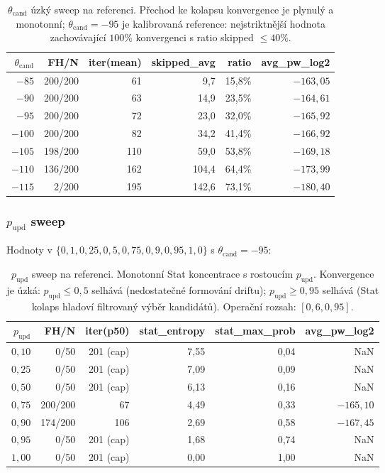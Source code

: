 \documentclass[11pt,a4paper]{article}
\begin{document}
\begin{table}[ht]
\centering
\small
\begin{tabular}{rrrrrr}
\toprule
$\theta_\text{cand}$ & FH/N & iter(mean) & skipped\_avg & ratio & avg\_pw\_log2 \\
\midrule
$-85$ & 200/200 & 61 & 9{,}7 & 15{,}8\% & $-163{,}05$ \\
$-90$ & 200/200 & 63 & 14{,}9 & 23{,}5\% & $-164{,}61$ \\
$-95$ & 200/200 & 72 & 23{,}0 & 32{,}0\% & $-165{,}92$ \\
$-100$ & 200/200 & 82 & 34{,}2 & 41{,}4\% & $-166{,}92$ \\
$-105$ & 198/200 & 110 & 59{,}0 & 53{,}8\% & $-169{,}18$ \\
$-110$ & 136/200 & 162 & 104{,}4 & 64{,}4\% & $-173{,}99$ \\
$-115$ & 2/200 & 195 & 142{,}6 & 73{,}1\% & $-180{,}40$ \\
\bottomrule
\end{tabular}
\caption{$\theta_\text{cand}$ úzký sweep na referenci. Přechod ke kolapsu konvergence je plynulý a monotonní; $\theta_\text{cand} = -95$ je kalibrovaná reference: nejstriktnější hodnota zachovávající $100\%$ konvergenci s ratio skipped $\leq 40\%$.}
\label{tab:cand-sweep}
\end{table}

\subsubsection{$p_\text{upd}$ sweep}\label{sec:empirical-pupd}

Hodnoty v $\{0{,}1, 0{,}25, 0{,}5, 0{,}75, 0{,}9, 0{,}95, 1{,}0\}$ s $\theta_\text{cand} = -95$:

\begin{table}[ht]
\centering
\small
\begin{tabular}{rrrrrr}
\toprule
$p_\text{upd}$ & FH/N & iter(p50) & stat\_entropy & stat\_max\_prob & avg\_pw\_log2 \\
\midrule
$0{,}10$ & 0/50 & 201 (cap) & 7{,}55 & 0{,}04 & NaN \\
$0{,}25$ & 0/50 & 201 (cap) & 7{,}09 & 0{,}09 & NaN \\
$0{,}50$ & 0/50 & 201 (cap) & 6{,}13 & 0{,}16 & NaN \\
$0{,}75$ & 200/200 & 67 & 4{,}49 & 0{,}33 & $-165{,}10$ \\
$0{,}90$ & 174/200 & 106 & 2{,}69 & 0{,}58 & $-167{,}45$ \\
$0{,}95$ & 0/50 & 201 (cap) & 1{,}68 & 0{,}74 & NaN \\
$1{,}00$ & 0/50 & 201 (cap) & 0{,}00 & 1{,}00 & NaN \\
\bottomrule
\end{tabular}
\caption{$p_\text{upd}$ sweep na referenci. Monotonní Stat koncentrace s rostoucím $p_\text{upd}$. Konvergence je úzká: $p_\text{upd} \leq 0{,}5$ selhává (nedostatečné formování driftu); $p_\text{upd} \geq 0{,}95$ selhává (Stat kolaps hladoví filtrovaný výběr kandidátů). Operační rozsah: $[0{,}6, 0{,}95]$.}
\label{tab:pupd-sweep}
\end{table}
\end{document}
